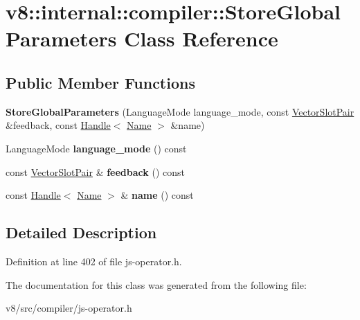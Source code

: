 \hypertarget{classv8_1_1internal_1_1compiler_1_1StoreGlobalParameters}{}\section{v8\+:\+:internal\+:\+:compiler\+:\+:Store\+Global\+Parameters Class Reference}
\label{classv8_1_1internal_1_1compiler_1_1StoreGlobalParameters}
\subsection*{Public Member Functions}
\begin{DoxyCompactItemize}
\item 
\mbox{\label{classv8_1_1internal_1_1compiler_1_1StoreGlobalParameters_a108b2a749f8dbbb45bd65b660f8e016b}} 
{\bfseries Store\+Global\+Parameters} (Language\+Mode language\+\_\+mode, const \mbox{\hyperlink{classv8_1_1internal_1_1VectorSlotPair}{Vector\+Slot\+Pair}} \&feedback, const \mbox{\hyperlink{classv8_1_1internal_1_1Handle}{Handle}}$<$ \mbox{\hyperlink{classv8_1_1internal_1_1Name}{Name}} $>$ \&name)
\item 
\mbox{\label{classv8_1_1internal_1_1compiler_1_1StoreGlobalParameters_ae010f297880d3f41df3344ddbdefc969}} 
Language\+Mode {\bfseries language\+\_\+mode} () const
\item 
\mbox{\label{classv8_1_1internal_1_1compiler_1_1StoreGlobalParameters_a0d11ba7128f2d7a34b18c9feccdd7399}} 
const \mbox{\hyperlink{classv8_1_1internal_1_1VectorSlotPair}{Vector\+Slot\+Pair}} \& {\bfseries feedback} () const
\item 
\mbox{\label{classv8_1_1internal_1_1compiler_1_1StoreGlobalParameters_ad38e40e47a40292259bd8ac6a2cbb0bc}} 
const \mbox{\hyperlink{classv8_1_1internal_1_1Handle}{Handle}}$<$ \mbox{\hyperlink{classv8_1_1internal_1_1Name}{Name}} $>$ \& {\bfseries name} () const
\end{DoxyCompactItemize}


\subsection{Detailed Description}


Definition at line 402 of file js-\/operator.\+h.



The documentation for this class was generated from the following file\+:\begin{DoxyCompactItemize}
\item 
v8/src/compiler/js-\/operator.\+h\end{DoxyCompactItemize}
